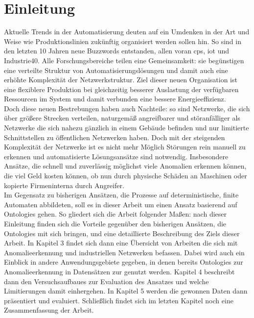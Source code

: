 \chapter{Einleitung}
Aktuelle Trends in der Automatisierung deuten auf ein Umdenken in der Art und Weise wie Produktionslinien zukünftig organisiert werden sollen hin. So sind in den letzten 10 Jahren neue Buzzwords entstanden, allen voran \acrfull{cps}, \acrfull{iot} und \Gls{Industrie40}. Alle Forschungsbereiche teilen eine Gemeinsamkeit: sie begünstigen eine verteilte Struktur von Automatisierungslösungen und damit auch eine erhöhte Komplexität der Netzwerkstruktur. Ziel dieser neuen Organisation ist eine flexiblere Produktion bei gleichzeitig besserer Auslastung der verfügbaren Ressourcen im System und damit verbunden eine bessere Energieeffizienz. \\
Doch diese neuen Bestrebungen haben auch Nachteile: so sind Netzwerke, die sich über größere Strecken verteilen, naturgemäß angreifbarer und störanfälliger als Netzwerke die sich nahezu gänzlich in einem Gebäude befinden und nur limitierte Schnittstellen zu öffentlichen Netzwerken haben. Doch mit der steigenden Komplexität der Netzwerke ist es nicht mehr Möglich Störungen rein manuell zu erkennen und automatisierte Lösungsansätze sind notwendig. Insbesondere Ansätze, die schnell und zuverlässig möglichst viele Anomalien erkennen können, die viel Geld kosten können, ob nun durch physische Schäden an Maschinen oder kopierte Firmeninterna durch Angreifer. \\
Im Gegensatz zu bisherigen Ansätzen, die Prozesse auf deterministische, finite Automaten abbildeten, soll es in dieser Arbeit um einen Ansatz basierend auf \Glspl{Ontologie} gehen. So gliedert sich die Arbeit folgender Maßen: nach dieser Einleitung finden sich die Vorteile gegenüber den bisherigen Ansätzen, die \Glspl{Ontologie} mit sich bringen, und eine detaillierte Beschreibung des Ziels dieser Arbeit. In Kapitel 3 findet sich dann eine Übersicht von Arbeiten die sich mit Anomalieerkennung und industriellen Netzwerken befassen. Dabei wird auch ein Einblick in andere Anwendungsgebiete gegeben, in denen bereits \Glspl{Ontologie} zur Anomalieerkennung in Datensätzen zur genutzt werden. Kapitel 4 beschreibt dann den Versuchsaufbaues zur Evaluation des Ansatzes und welche Limitierungen damit einhergehen. In Kapitel 5 werden die gewonnen Daten dann präsentiert und evaluiert. Schließlich findet sich im letzten Kapitel noch eine Zusammenfassung der Arbeit.